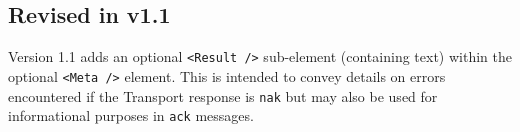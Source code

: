 \documentclass[a4paper,11pt]{ivoa}
\begin{document}
\subsection{Revised in v1.1}

Version 1.1 adds an optional \texttt{<Result~/>} sub-element (containing text)
within the optional \texttt{<Meta~/>} element. This is intended to convey
details on errors encountered if the Transport response is \texttt{nak} but
may also be used for informational purposes in \texttt{ack} messages.



\end{document}
